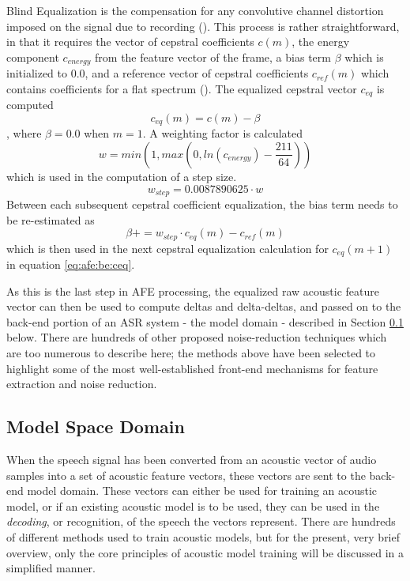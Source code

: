 Blind Equalization is the compensation for any convolutive channel distortion imposed on the signal due to recording (\cite{mauuary:98}).  This process is rather straightforward, in that it requires the vector of cepstral coefficients $c(m)$, the energy component $c_{energy}$ from the feature vector of the frame, a bias term $\beta$ which is initialized to $0.0$, and a reference vector of cepstral coefficients $c_{ref}(m)$ which contains coefficients for a flat spectrum (\cite{etsi:02}).  The equalized cepstral vector $c_{eq}$ is computed \begin{equation}\label{eq:afe:be:ceq} c_{eq}(m) = c(m) - \beta \end{equation}, where $\beta = 0.0$ when $m = 1$.  A weighting factor is calculated \begin{equation} w = min( 1 , max( 0 , ln(c_{energy}) - \dfrac{211}{64} ) ) \end{equation} which is used in the computation of a step size. \begin{equation}\label{eq:afe:be:step} w_{step} = 0.0087890625 \cdot w \end{equation}  Between each subsequent cepstral coefficient equalization, the bias term needs to be re-estimated as \begin{equation} \beta \mathrel{{+}{=}} w_{step} \cdot c_{eq}(m) - c_{ref}(m) \end{equation} which is then used in the next cepstral equalization calculation for $c_{eq}(m+1)$ in equation \ref{eq:afe:be:ceq}.

As this is the last step in AFE processing, the equalized raw acoustic feature vector can then be used to compute deltas and delta-deltas, and passed on to the back-end portion of an ASR system - the model domain - described in Section \ref{sec:model-domain} below.  There are hundreds of other proposed noise-reduction techniques which are too numerous to describe here; the methods above have been selected to highlight some of the most well-established front-end mechanisms for feature extraction and noise reduction.


\subsection{Model Space Domain}\label{sec:model-domain}

When the speech signal has been converted from an acoustic vector of audio samples into a set of acoustic feature vectors, these vectors are sent to the back-end model domain.  These vectors can either be used for training an acoustic model, or if an existing acoustic model is to be used, they can be used in the \textit{decoding}, or recognition, of the speech the vectors represent.  There are hundreds of different methods used to train acoustic models, but for the present, very brief overview, only the core principles of acoustic model training will be discussed in a simplified manner.  

